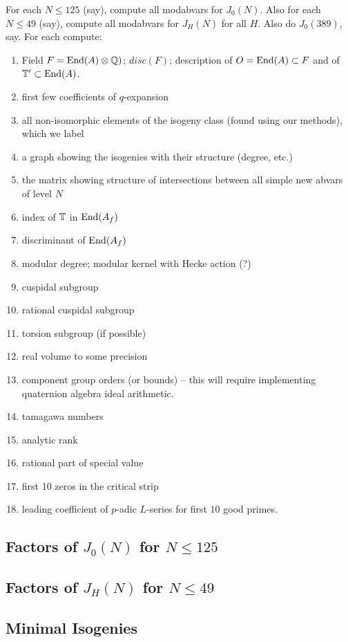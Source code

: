 \documentclass{article}
\begin{document}
For each $N\leq 125$ (say), compute all modabvars for $J_0(N)$.
Also for each $N\leq 49$ (say), compute all modabvars for $J_H(N)$ for
all $H$.  Also do $J_0(389)$, say.
For each compute:
\begin{enumerate}
\item Field $F = \operatorname{End}(A)\otimes \mathbb{Q})$; $disc(F)$; description of $O=\operatorname{End}(A) \subset F$ and of $\mathbb{T}'\subset \operatorname{End}(A)$.
\item first few coefficients of $q$-expansion
\item all non-isomorphic elements of the isogeny class (found using our methods),
which we label
\item a graph showing the isogenies with their structure (degree, etc.)
\item the matrix showing structure of intersections between all simple new
abvars of level $N$
\item index of $\mathbb{T}$ in $\operatorname{End}(A_f)$
\item discriminant of $\operatorname{End}(A_f)$
\item modular degree; modular kernel with Hecke action (?)
\item cuspidal subgroup
\item rational cuspidal subgroup
\item torsion subgroup (if possible)
\item real volume to some precision
\item component group orders (or bounds) -- this will require
implementing quaternion algebra ideal arithmetic.
\item tamagawa numbers
\item analytic rank
\item rational part of special value
\item first 10 zeros in the critical strip
\item leading coefficient of $p$-adic $L$-series
for first $10$ good primes.
\end{enumerate}

\subsection{Factors of $J_0(N)$ for $N\leq 125$}

\subsection{Factors of $J_H(N)$ for $N\leq 49$}

\subsection{Minimal Isogenies}
\end{document}
